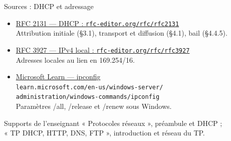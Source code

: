 \documentclass[aspectratio=169,11pt]{beamer}
\begin{document}
\begin{frame}{Sources : DHCP et adressage}
  \small
  \begin{itemize}
    \item \href{https://www.rfc-editor.org/rfc/rfc2131.html}
      {RFC 2131 — DHCP : \texttt{rfc-editor.org/rfc/rfc2131}}\\
      Attribution initiale (§3.1), transport et diffusion (§4.1), bail (§4.4.5).
    \item \href{https://www.rfc-editor.org/rfc/rfc3927.html}
      {RFC 3927 — IPv4 local : \texttt{rfc-editor.org/rfc/rfc3927}}\\
      Adresses locales au lien en 169.254/16.
    \item \href{https://learn.microsoft.com/en-us/windows-server/administration/windows-commands/ipconfig}
      {Microsoft Learn — ipconfig}\\
      \texttt{learn.microsoft.com/en-us/windows-server/}\\
      \texttt{administration/windows-commands/ipconfig}\\
      Paramètres /all, /release et /renew sous Windows.
  \end{itemize}
  \begin{block}{Supports de l'enseignant}
    « Protocoles réseaux », préambule et DHCP ;\\
    « TP DHCP, HTTP, DNS, FTP », introduction et réseau du TP.
  \end{block}
\end{frame}
\end{document}
